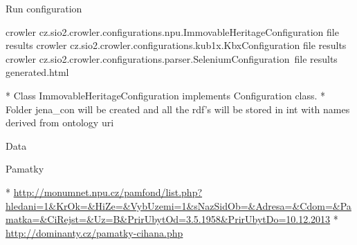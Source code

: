 \secc Run configuration 

\begtt
crowler cz.sio2.crowler.configurations.npu.ImmovableHeritageConfiguration file results
crowler cz.sio2.crowler.configurations.kub1x.KbxConfiguration file results
crowler cz.sio2.crowler.configurations.parser.SeleniumConfiguration\
         file results generated.html
\endtt

\begitems
  * Class ImmovableHeritageConfiguration implements Configuration class. 
  * Folder jena\_con will be created and all the rdf's will be stored in int with names derived from ontology uri
\enditems



\chap Data


\sec Pamatky

\begitems
  * \url{http://monumnet.npu.cz/pamfond/list.php?hledani=1&KrOk=&HiZe=&VybUzemi=1&sNazSidOb=&Adresa=&Cdom=&Pamatka=&CiRejst=&Uz=B&PrirUbytOd=3.5.1958&PrirUbytDo=10.12.2013}
  * \url{http://dominanty.cz/pamatky-cihana.php}
\enditems



